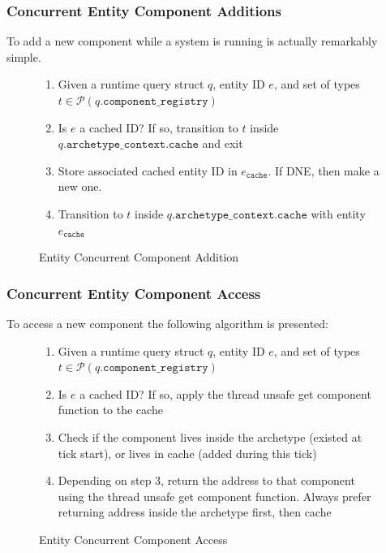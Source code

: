 \subsubsection{Concurrent Entity Component Additions}
To add a new component while a system is running is actually remarkably simple. 

\begin{figure}[htbp]
\begin{enumerate}
    \item Given a runtime query struct $q$, entity ID $e$, and set of types $t \in \mathcal{P}(q.\texttt{component\_registry})$
    \item Is $e$ a cached ID? If so, transition to $t$ inside $q.\texttt{archetype\_context.cache}$ and exit
    \item Store associated cached entity ID in $e_{\texttt{cache}}$. If DNE, then make a new one.
    \item Transition to $t$ inside $q.\texttt{archetype\_context.cache}$ with entity $e_{\texttt{cache}}$
\end{enumerate}
\caption{Entity Concurrent Component Addition}
\label{alg:conc_add}
\end{figure}

\subsubsection{Concurrent Entity Component Access}
To access a new component the following algorithm is presented:

\begin{figure}[htbp]
\begin{enumerate}
    \item Given a runtime query struct $q$, entity ID $e$, and set of types $t \in \mathcal{P}(q.\texttt{component\_registry})$
    \item Is $e$ a cached ID? If so, apply the thread unsafe get component function to the cache 
    \item Check if the component lives inside the archetype (existed at tick start), or lives in cache (added during this tick)
    \item Depending on step 3, return the address to that component using the thread unsafe get component function. Always prefer returning address inside the archetype first, then cache
\end{enumerate}
\caption{Entity Concurrent Component Access}
\label{alg:conc_access}
\end{figure}


